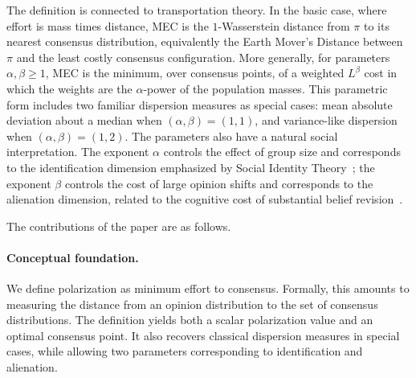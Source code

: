 The definition is connected to transportation theory. In the basic
case, where effort is mass times distance, MEC is the
\(1\)-Wasserstein distance from \(\pi\) to its nearest consensus
distribution, equivalently the Earth Mover's Distance
between \(\pi\) and the least costly consensus configuration. More
generally, for parameters \(\alpha,\beta\geq 1\), MEC is the minimum,
over consensus points, of a weighted \(L^\beta\) cost in which the
weights are the \(\alpha\)-power of the population masses. This
parametric form includes two familiar dispersion measures as special
cases: mean absolute deviation about a median when
\((\alpha,\beta)=(1,1)\), and variance-like dispersion when
\((\alpha,\beta)=(1,2)\). The parameters also have a natural social
interpretation. The exponent \(\alpha\) controls the effect of group
size and corresponds to the identification dimension emphasized by
Social Identity Theory~\cite{TajfelTurner1979}; the exponent \(\beta\)
controls the cost of large opinion shifts and corresponds to the
alienation dimension, related to the cognitive cost of substantial
belief revision~\cite{Festinger1957}.

The contributions of the paper are as follows.

\paragraph{Conceptual foundation.}
We define polarization as minimum effort to consensus. Formally, this
amounts to measuring the distance from an opinion distribution to the
set of consensus distributions. The definition yields both a scalar
polarization value and an optimal consensus point. It also recovers
classical dispersion measures in special cases, while allowing two
parameters corresponding to identification and alienation.

